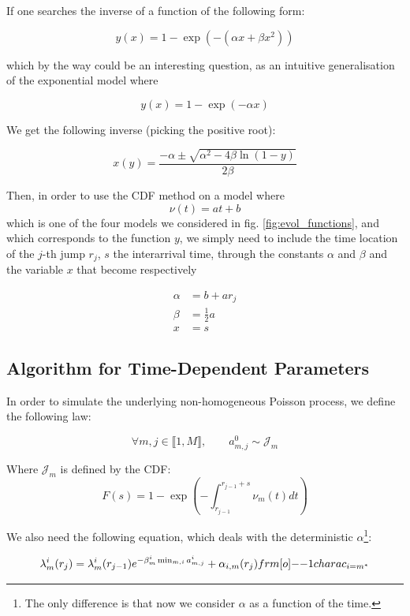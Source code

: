 \begin{ajoutationV}{}{}
If one searches the inverse of a function of the following form:

$$ y(x) = 1 - \exp ( - (\alpha x + \beta x^2) ) $$

which by the way could be an interesting question, as an intuitive generalisation of the exponential model where 

$$ y(x) = 1 - \exp ( -\alpha x ) $$

We get the following inverse (picking the positive root):

$$ x(y) = \frac{- \alpha \pm \sqrt{\alpha^2 - 4 \beta \ln(1-y) }  }{2 \beta}$$

Then, in order to use the CDF method on a model where $$ \nu(t) =  a t + b $$ 
which is one of the four models we considered in fig. \ref{fig:evol_functions}, and which corresponds to the function $y$, we simply need to include the time location of the $j$-th jump $r_j$, $s$ the interarrival time, through the constants $\alpha$ and $\beta$ and the variable $x$ that become respectively 

\begin{align*}
\alpha &= b + a r_j  \\
\beta &= \frac 1 2 a \\
x &= s
\end{align*}


\end{ajoutationV}


\subsection{Algorithm for Time-Dependent Parameters}

In order to simulate the underlying non-homogeneous Poisson process, we define the following law:

$$ \forall m,j \in  \llbracket 1, M \rrbracket, \qquad a_{m,j}^0 \sim \mathcal J_m  $$

Where $\mathcal J_m $ is defined by the CDF:
\begin{equation}
\label{eq:J_defined}
F(s) = 1 - \exp \left ( - \int_{r_{j-1}}^{r_{j-1} + s } \nu_m (t) dt \right )
\end{equation}

We also need the following equation, which deals with the deterministic $\alpha$\footnote{The only difference is that now we consider $\alpha$ as a function of the time.}:

\begin{equation}
\lambda_m^i ( r_j ) = \lambda_m^i ( r_{j-1} )  e^{ - \beta_m^i \min_{m,i} a_{m,j}^i } + \alpha_{i,m} (r_j) \11charac_{i = m^*}
\label{eq:update_lambda_time} 
\end{equation}




